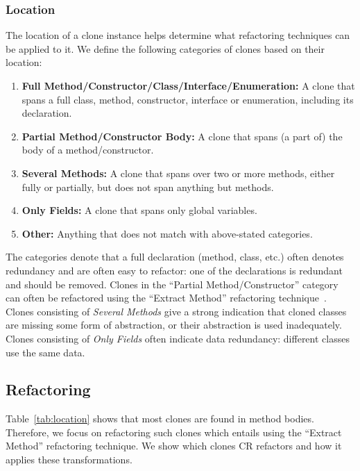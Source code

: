 \documentclass[a4paper,UKenglish,cleveref, autoref, thm-restate,authorcolumns]{lipics-v2019}
\begin{document}
\subsubsection{Location}\label{sec:location}
The location of a clone instance helps determine what refactoring techniques can be applied to it. We define the following categories of clones based on their location:
\begin{enumerate}
  \item \textbf{Full Method/Constructor/Class/Interface/Enumeration:} A clone that spans a full class, method, constructor, interface or enumeration, including its declaration.
  \item \textbf{Partial Method/Constructor Body:} A clone that spans (a part of) the body of a method/constructor.
  \item \textbf{Several Methods:} A clone that spans over two or more methods, either fully or partially, but does not span anything but methods.
  \item \textbf{Only Fields:} A clone that spans only global variables.
  \item \textbf{Other:} Anything that does not match with above-stated categories.
\end{enumerate}
The categories denote that a full declaration (method, class, etc.) often denotes redundancy and are often easy to refactor: one of the declarations is redundant and should be removed. Clones in the ``Partial Method/Constructor'' category can often be refactored using the ``Extract Method'' refactoring technique~\cite{mazinanian2016jdeodorant}. Clones consisting of \textit{Several Methods} give a strong indication that cloned classes are missing some form of abstraction, or their abstraction is used inadequately. Clones consisting of \textit{Only Fields} often indicate data redundancy: different classes use the same data.

\subsection{Refactoring}\label{sec:refactoring}
Table~\ref{tab:location} shows that most clones are found in method bodies. Therefore, we focus on refactoring such clones which entails using the ``Extract Method'' refactoring technique. We show which clones CR refactors and how it applies these transformations.
\end{document}
